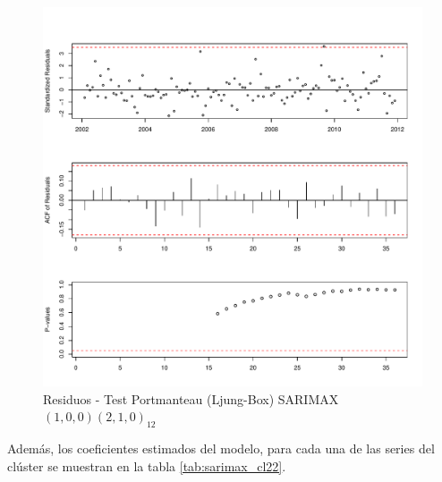 \documentclass[12pt,oneside]{book}\usepackage[]{graphicx}\usepackage[]{color}
\makeatletter
\def\maxwidth{ %
  \ifdim\Gin@nat@width>\linewidth
    \linewidth
  \else
    \Gin@nat@width
  \fi
}
\newenvironment{knitrout}{}{} %
\theoremstyle{definition} %
\makeatother
\begin{document}
\begin{knitrout}
\color{fgcolor}\begin{figure}[h]

{\centering \includegraphics[width=\maxwidth]{figure/unnamed-chunk-103-1} 

}

\caption[Residuos - Test Portmanteau (Ljung-Box) SARIMAX$(1,0,0)(2,1,0)_{12}$]{Residuos - Test Portmanteau (Ljung-Box) SARIMAX$(1,0,0)(2,1,0)_{12}$}\label{fig:unnamed-chunk-103}
\end{figure}


\end{knitrout}


Además, los coeficientes estimados del modelo, para cada una de las series del clúster se muestran en la tabla \ref{tab:sarimax_cl22}.
\end{document}
